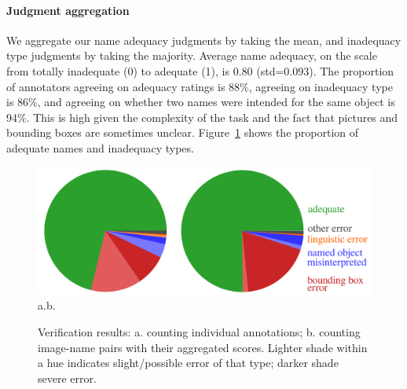 
\paragraph{Judgment aggregation}
We aggregate our name adequacy judgments by taking the mean, and inadequacy type judgments by taking the majority.
Average name adequacy, on the scale from totally inadequate (0) to adequate (1), is 0.80 (\mbox{std=$0.093$}).
The proportion of annotators agreeing on adequacy ratings is 88\%, agreeing on inadequacy type is 86\%, and agreeing on whether two names were intended for the same object is 94\%.
This is high given the complexity of the task
and the fact that pictures and bounding boxes are sometimes unclear.
Figure~\ref{fig:verification-piechart} shows the proportion of adequate names and inadequacy types.
\begin{figure}[t]
	\centering
	\includegraphics[width=\columnwidth]{images/verification_piechart_double.pdf}\\
	\hspace*{\fill}a.\hspace*{\fill}\hspace*{\fill}b.\hspace*{\fill}\hspace*{\fill}
	\caption{Verification results: a. counting individual annotations; b. counting image-name pairs with their aggregated scores. Lighter shade within a hue indicates slight/possible error of that type; darker shade severe error.}
	\label{fig:verification-piechart}
\end{figure}

